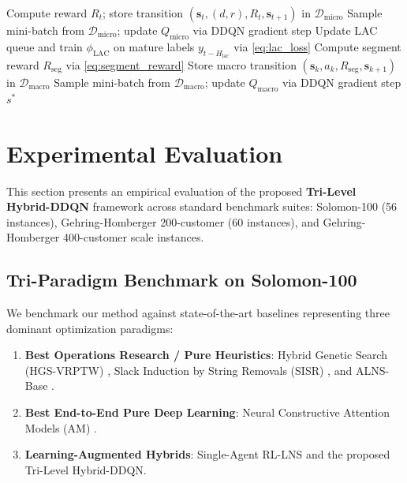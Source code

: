 \documentclass{ieeeaccess}
\begin{document}
\begin{algorithm}[!t]
\begin{algorithmic}[1]
            \EndIf
        \EndIf
    \EndIf
    \State Compute reward $R_t$; store transition $(\mathbf{s}_t, (d,r), R_t, \mathbf{s}_{t+1})$ in $\mathcal{D}_{\text{micro}}$
    \State Sample mini-batch from $\mathcal{D}_{\text{micro}}$; update $Q_{\text{micro}}$ via DDQN gradient step
    \State Update LAC queue and train $\phi_{\text{LAC}}$ on mature labels $y_{t-H_{\text{lac}}}$ via \eqref{eq:lac_loss}
        \State Compute segment reward $R_{\text{seg}}$ via \eqref{eq:segment_reward}
        \State Store macro transition $(\mathbf{s}_k, a_k, R_{\text{seg}}, \mathbf{s}_{k+1})$ in $\mathcal{D}_{\text{macro}}$
        \State Sample mini-batch from $\mathcal{D}_{\text{macro}}$; update $Q_{\text{macro}}$ via DDQN gradient step
    \EndIf
\EndFor
\Return $s^*$
\end{algorithmic}
\end{algorithm}

\section{Experimental Evaluation}
\label{sec:experiments}

This section presents an empirical evaluation of the proposed \textbf{Tri-Level Hybrid-DDQN} framework across standard benchmark suites: Solomon-100 (56 instances), Gehring-Homberger 200-customer (60 instances), and Gehring-Homberger 400-customer scale instances.

\subsection{Tri-Paradigm Benchmark on Solomon-100}
\label{sec:solomon_results}

We benchmark our method against state-of-the-art baselines representing three dominant optimization paradigms:
\begin{enumerate}
    \item \textbf{Best Operations Research / Pure Heuristics}: Hybrid Genetic Search (HGS-VRPTW) \cite{vidal2013hybrid}, Slack Induction by String Removals (SISR) \cite{christiaens2020slack}, and ALNS-Base \cite{Ropke2006}.
    \item \textbf{Best End-to-End Pure Deep Learning}: Neural Constructive Attention Models (AM) \cite{kool2019attention,lin2021neural}.
    \item \textbf{Learning-Augmented Hybrids}: Single-Agent RL-LNS \cite{lu2020learning,son2023learning} and the proposed Tri-Level Hybrid-DDQN.
\end{enumerate}
\end{document}
